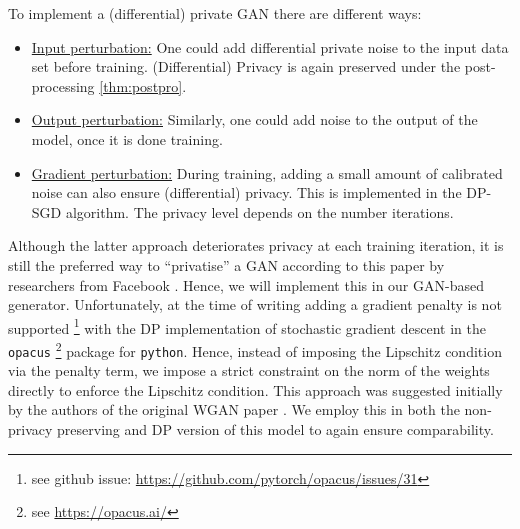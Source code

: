 To implement a (differential) private GAN there are different ways:
\begin{itemize}
    \item \underline{Input perturbation:} One could add differential private noise to the input data set before training. (Differential) Privacy is again preserved under the post-processing \cref{thm:postpro}.
    \item \underline{Output perturbation:} Similarly, one could add noise to the output of the model, once it is done training. 
    \item \underline{Gradient perturbation:} During training, adding a small amount of calibrated noise can also ensure (differential) privacy. This is implemented in the DP-SGD algorithm. The privacy level depends on the number iterations. 
\end{itemize}
Although the latter approach deteriorates privacy at each training iteration, it is still the preferred way to ``privatise'' a GAN according to this paper by researchers from Facebook \parencite{vandermaaten2020tradeoffs}. Hence, we will implement this in our GAN-based generator. Unfortunately, at the time of writing adding a gradient penalty is not supported \footnote{see github issue: \href{https://github.com/pytorch/opacus/issues/31}{https://github.com/pytorch/opacus/issues/31}} with the DP implementation of stochastic gradient descent in the \texttt{opacus} \footnote{see \href{https://opacus.ai/}{https://opacus.ai/}} package for \texttt{python}. Hence, instead of imposing the Lipschitz condition via the penalty term, we impose a strict constraint on the norm of the weights directly to enforce the Lipschitz condition. This approach was suggested initially by the authors of the original WGAN paper \parencite{arjovsky2017wasserstein}. We employ this in both the non-privacy preserving and DP version of this model to again ensure comparability.

